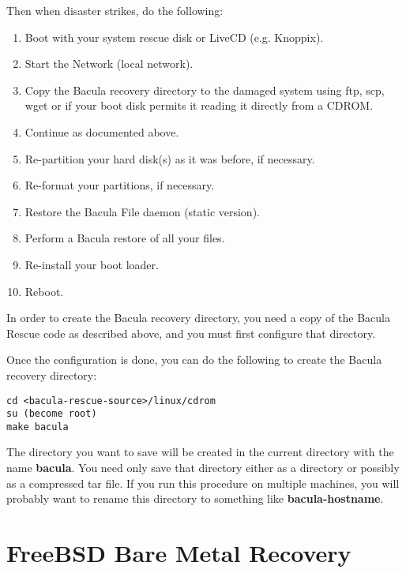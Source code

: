 Then when disaster strikes, do the following:

\begin{enumerate}
\item Boot with your system rescue disk or LiveCD
   (e.g. Knoppix).
\item Start the Network (local network).  
\item Copy the Bacula recovery directory to the 
   damaged system using ftp, scp, wget or if your
   boot disk permits it reading it directly from a
   CDROM.
\item Continue as documented above.
\item Re-partition your hard disk(s) as it was before,  
   if necessary.
\item Re-format your partitions, if necessary.  
\item Restore the Bacula File daemon (static version).  
\item Perform a Bacula restore of all your files.  
\item Re-install your boot loader.  
\item Reboot. 
\end{enumerate}

In order to create the Bacula recovery directory, you need
a copy of the Bacula Rescue code as described above, and
you must first configure that directory.

Once the configuration is done, you can do the following
to create the Bacula recovery directory:

\footnotesize
\begin{verbatim}
cd <bacula-rescue-source>/linux/cdrom
su (become root)
make bacula
\end{verbatim}
\normalsize

The directory you want to save will be created in
the current directory with the name {\bf bacula}.  You
need only save that directory either as a directory or
possibly as a compressed tar file.  If you run this procedure
on multiple machines, you will probably want to rename this directory
to something like {\bf bacula-hostname}.



\label{FreeBSD1}
\section{FreeBSD Bare Metal Recovery}

